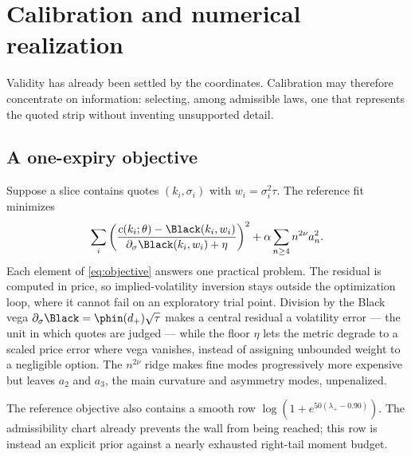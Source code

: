 \section{Calibration and numerical realization}
\label{sec:calibration}

Validity has already been settled by the coordinates.  Calibration may
therefore concentrate on information: selecting, among admissible laws, one
that represents the quoted strip without inventing unsupported detail.

\subsection{A one-expiry objective}

Suppose a slice contains quotes $(k_i,\sigma_i)$ with
$w_i=\sigma_i^2\tau$.  The reference fit minimizes
\begin{equation}
\sum_i\left(
\frac{c(k_i;\theta)-\Black(k_i,w_i)}
     {\partial_\sigma\Black(k_i,w_i)+\eta}
\right)^2
+\alpha\sum_{n\ge4}n^{2\nu}a_n^2.
\label{eq:objective}
\end{equation}
Each element of \eqref{eq:objective} answers one practical problem.  The
residual is computed in price, so implied-volatility inversion stays outside
the optimization loop, where it cannot fail on an exploratory trial point.
Division by the Black vega $\partial_\sigma\Black=\phin(d_+)\sqrt\tau$ makes
a central residual a volatility error --- the unit in which quotes are
judged --- while the floor $\eta$ lets the metric degrade to a scaled price
error where vega vanishes, instead of assigning unbounded weight to a
negligible option.  The $n^{2\nu}$ ridge makes fine modes progressively more
expensive but leaves $a_2$ and $a_3$, the main curvature and asymmetry
modes, unpenalized.

The reference objective also contains a smooth row
$\log(1+e^{50(\lambda_+-0.90)})$.  The admissibility chart already prevents
the wall from being reached; this row is instead an explicit prior against a
nearly exhausted right-tail moment budget.

